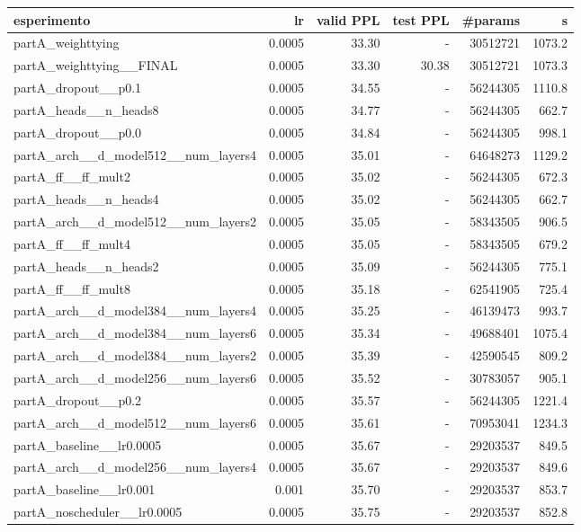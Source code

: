 \begin{tabular}{lrrrrr}
\toprule
esperimento & lr & valid PPL & test PPL & \#params & s \\
\midrule
partA\_weighttying & 0.0005 & 33.30 & - & 30512721 & 1073.2 \\
partA\_weighttying\_\_FINAL & 0.0005 & 33.30 & 30.38 & 30512721 & 1073.3 \\
partA\_dropout\_\_p0.1 & 0.0005 & 34.55 & - & 56244305 & 1110.8 \\
partA\_heads\_\_n\_heads8 & 0.0005 & 34.77 & - & 56244305 & 662.7 \\
partA\_dropout\_\_p0.0 & 0.0005 & 34.84 & - & 56244305 & 998.1 \\
partA\_arch\_\_d\_model512\_\_num\_layers4 & 0.0005 & 35.01 & - & 64648273 & 1129.2 \\
partA\_ff\_\_ff\_mult2 & 0.0005 & 35.02 & - & 56244305 & 672.3 \\
partA\_heads\_\_n\_heads4 & 0.0005 & 35.02 & - & 56244305 & 662.7 \\
partA\_arch\_\_d\_model512\_\_num\_layers2 & 0.0005 & 35.05 & - & 58343505 & 906.5 \\
partA\_ff\_\_ff\_mult4 & 0.0005 & 35.05 & - & 58343505 & 679.2 \\
partA\_heads\_\_n\_heads2 & 0.0005 & 35.09 & - & 56244305 & 775.1 \\
partA\_ff\_\_ff\_mult8 & 0.0005 & 35.18 & - & 62541905 & 725.4 \\
partA\_arch\_\_d\_model384\_\_num\_layers4 & 0.0005 & 35.25 & - & 46139473 & 993.7 \\
partA\_arch\_\_d\_model384\_\_num\_layers6 & 0.0005 & 35.34 & - & 49688401 & 1075.4 \\
partA\_arch\_\_d\_model384\_\_num\_layers2 & 0.0005 & 35.39 & - & 42590545 & 809.2 \\
partA\_arch\_\_d\_model256\_\_num\_layers6 & 0.0005 & 35.52 & - & 30783057 & 905.1 \\
partA\_dropout\_\_p0.2 & 0.0005 & 35.57 & - & 56244305 & 1221.4 \\
partA\_arch\_\_d\_model512\_\_num\_layers6 & 0.0005 & 35.61 & - & 70953041 & 1234.3 \\
partA\_baseline\_\_lr0.0005 & 0.0005 & 35.67 & - & 29203537 & 849.5 \\
partA\_arch\_\_d\_model256\_\_num\_layers4 & 0.0005 & 35.67 & - & 29203537 & 849.6 \\
partA\_baseline\_\_lr0.001 & 0.001 & 35.70 & - & 29203537 & 853.7 \\
partA\_noscheduler\_\_lr0.0005 & 0.0005 & 35.75 & - & 29203537 & 852.8 \\

\end{tabular}
